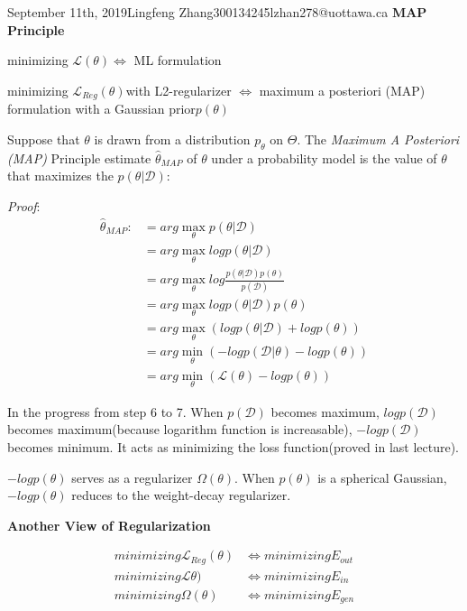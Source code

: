 \documentclass{article}
\begin{document}
\begin{lecture}{September 11th, 2019}{Lingfeng Zhang}{300134245}{lzhan278@uottawa.ca}
\textbf{MAP Principle}

minimizing $\mathcal{L}(\theta) \Leftrightarrow$ ML formulation

minimizing $\mathcal{L}_{Reg}(\theta)$with L2-regularizer $ \Leftrightarrow$ maximum a posteriori (MAP) formulation with a Gaussian prior$p(\theta)$

Suppose that $\theta$ is drawn from a distribution $p_\theta$ on $\Theta$. The \textit{Maximum A Posteriori (MAP)} Principle estimate $\hat \theta_{MAP}$ of $\theta$ under a probability model is the value of $\theta$ that maximizes the $p(\theta|\mathcal{D})$:

\noindent \textit{Proof}:
        \begin{align*}
            \hat{\theta}_{MAP} :&= arg\max_{\theta}p (\theta|\mathcal{D})\\
            &= arg\max_{\theta}logp (\theta|\mathcal{D})\\
            &= arg\max_{\theta}log \frac{p (\theta |\mathcal{D})p(\theta )}{p(\mathcal{D})}\\
            &= arg\max_{\theta}log p (\theta |\mathcal{D})p(\theta )\\
            &= arg\max_{\theta}(log p (\theta |\mathcal{D})+logp(\theta ))\\
            &=arg\min_{\theta}(-log p (\mathcal{D}|\theta) - log p (\theta)) \\
            &=arg\min_{\theta}(\mathcal{L}(\theta) - log p (\theta)) 
        \end{align*}
        
In the progress from step 6 to 7. When $p (\mathcal{D})$ becomes maximum, $logp (\mathcal{D})$ becomes maximum(because logarithm function is increasable), $-logp (\mathcal{D})$ becomes minimum. It acts as minimizing the loss function(proved in last lecture).

$-log p(\theta)$ serves as a regularizer $\Omega(\theta)$. When $p(\theta)$ is a spherical Gaussian, $-log p(\theta)$ reduces to the weight-decay regularizer.

\textbf{Another View of Regularization}

\begin{align*}
minimizing \mathcal{L}_{Reg}(\theta) &\Leftrightarrow minimizing E_{out}\\
minimizing \mathcal{L}\theta) &\Leftrightarrow minimizing E_{in} \\
minimizing \Omega(\theta) &\Leftrightarrow minimizing E_{gen}
\end{align*}


\end{lecture}
\end{document}
